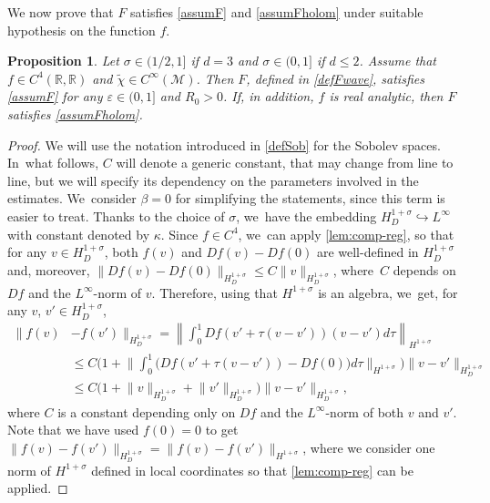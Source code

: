 \documentclass[JEP,XML,SOM,Unicode,published]{cedram}
\newtheorem{proposition}[theorem]{Proposition}
\theoremstyle{definition}
\let\mc\mathcal
\let\veps\varepsilon
\newcommand{\M}{\mc{M}}
\newcommand{\R}{\mathbb{R}}
\providecommand{\norm}[1]{\lVert#1\rVert}
\newcommand{\Norm}[1]{\left\lVert#1\right\rVert}
\begin{document}
We now prove that $F$ satisfies \cref{assumF} and \ref{assumFholom} under suitable hypothesis on the function $f$.

\begin{proposition}\label{prop:f-assumptions}
Let $\sigma\in (1/2, 1]$ if $d=3$ and $\sigma\in (0,1]$ if $d\leq 2$. Assume that $f\in C^4(\R,\R)$ and $\widetilde{\chi}\in C^{\infty}(\M)$. Then $F$, defined in \eqref{defFwave}, satisfies \cref{assumF} for any $\veps\in (0, 1]$ and $R_0>0$. If, in addition, $f$ is real analytic, then $F$ satisfies \cref{assumFholom}.
\end{proposition}
\begin{proof} We will use the notation introduced in \eqref{defSob} for the Sobolev spaces. In~what follows, $C$ will denote a generic constant, that may change from line to line, but we will specify its dependency on the parameters involved in the estimates. We~consider $\beta=0$ for simplifying the statements, since this term is easier to treat. Thanks to the choice of $\sigma$, we~have the embedding $H_D^{1+\sigma}\hookrightarrow L^\infty$ with constant denoted by $\kappa$. Since $f\in C^4$, we~can apply \cref{lem:comp-reg}, so that for any $v\in H_D^{1+\sigma}$, both $f(v)$ and $Df(v)-Df(0)$ are well-defined in $H_D^{1+\sigma}$ and, moreover, $\norm{Df(v)-Df(0)}_{H_D^{1+\sigma}}\leq C\norm{v}_{H_D^{1+\sigma}}$, where~$C$ depends on $Df$ and the $L^{\infty}$-norm of $v$. Therefore, using that $H^{1+\sigma}$ is an algebra, we~get, for any $v$, $v'\in H_D^{1+\sigma}$,
\begin{equation}\label{fineq1}
\begin{aligned}
\norm{f(v)&-f(v')}_{H_D^{1+\sigma}}=\Norm{\int_0^1 Df(v'+\tau(v-v'))(v-v')d\tau}_{H^{1+\sigma}}\\
&\leq C\biggl(1+\biggl\|\int_0^1 \big(Df(v'+\tau(v-v'))-Df(0)\big)d\tau\biggr\|_{H^{1+\sigma}}\biggr)\norm{v-v'}_{H_D^{1+\sigma}}\\
&\leq C\bigl(1+\norm{v}_{H_D^{1+\sigma}}+\norm{v'}_{H_D^{1+\sigma}}\bigr)\norm{v-v'}_{H_D^{1+\sigma}},
\end{aligned}
\end{equation}
where $C$ is a constant depending only on $Df$ and the $L^\infty$-norm of both $v$ and $v'$. Note that we have used $f(0)=0$ to get $\norm{f(v)-f(v')}_{H_D^{1+\sigma}}=\norm{f(v)-f(v')}_{H^{1+\sigma}}$, where we consider one norm of $H^{1+\sigma}$ defined in local coordinates so that \cref{lem:comp-reg} can be applied.


\end{proof}
\end{document}
